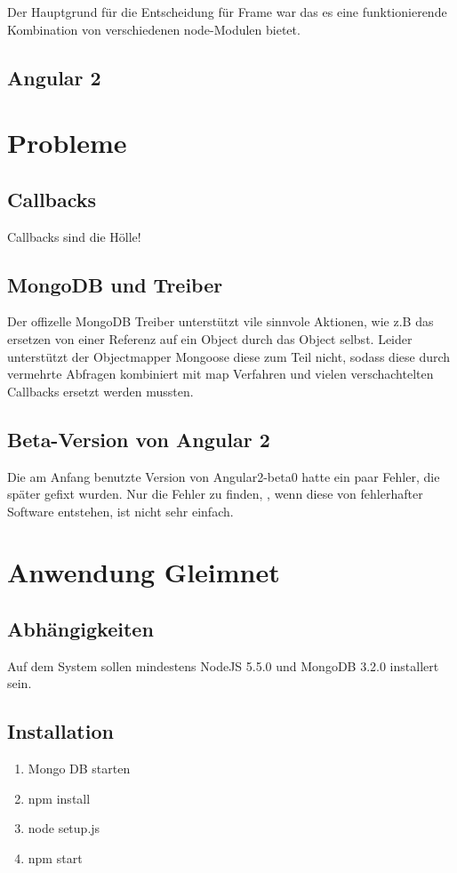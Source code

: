 \documentclass[12pt]{article} %
\begin{document}
Der Hauptgrund für die Entscheidung für Frame war das es eine funktionierende Kombination von verschiedenen node-Modulen bietet.
\subsection{Angular 2}



\section{Probleme}

\subsection{Callbacks}
Callbacks sind die Hölle!

\subsection{MongoDB und Treiber}
Der offizelle MongoDB Treiber unterstützt vile sinnvole Aktionen, wie z.B das ersetzen von einer Referenz auf ein Object durch das Object selbst. Leider unterstützt der Objectmapper Mongoose diese zum Teil nicht, sodass diese durch vermehrte Abfragen kombiniert mit map Verfahren und vielen verschachtelten Callbacks ersetzt werden mussten.

\subsection{Beta-Version von Angular 2}
Die am Anfang benutzte Version von Angular2-beta0 hatte ein paar Fehler, die später gefixt wurden. Nur die Fehler zu finden, , wenn diese von fehlerhafter Software entstehen, ist nicht sehr einfach.


\section{Anwendung Gleimnet}
\subsection{Abhängigkeiten}
Auf dem System sollen mindestens NodeJS 5.5.0 und MongoDB 3.2.0 installert sein.
\subsection{Installation}
\begin{enumerate}
\item Mongo DB starten
\item npm install
\item node setup.js
\item npm start
\end{enumerate}
\end{document}
